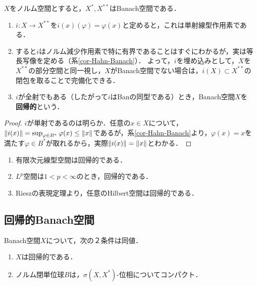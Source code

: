 \documentclass[uplatex,dvipdfmx]{jsreport}
\begin{document}
\begin{definition}
    $X$をノルム空間とすると，$X^*,X^{**}$はBanach空間である．
    \begin{enumerate}
        \item $i:X\to X^{**}$を$i(x)(\varphi)=\varphi(x)$と定めると，これは単射線型作用素である．
        \item すると$i$はノルム減少作用素で特に有界であることはすぐにわかるが，実は等長写像を定める（系\ref{cor-Hahn-Banach}）．
        よって，$i$を埋め込みとして，$X$を$X^{**}$の部分空間と同一視し，$X$がBanach空間でない場合は，$i(X)\subset X^{**}$の閉包を取ることで完備化できる．
        \item $i$が全射でもある（したがって$i$はBanの同型である）とき，Banach空間$X$を\textbf{回帰的}という．
    \end{enumerate}
\end{definition}
\begin{proof}
    $i$が単射であるのは明らか．任意の$x\in X$について，$\|i(x)\|=\sup_{\varphi\in B^*}\varphi(x)\le\|x\|$であるが，系\ref{cor-Hahn-Banach}より，$\varphi(x)=x$を満たす$\varphi\in B^*$が取れるから，実際$\|i(x)\|=\|x\|$とわかる．
\end{proof}
\begin{example}\mbox{}
    \begin{enumerate}
        \item 有限次元線型空間は回帰的である．
        \item $L^p$空間は$1<p<\infty$のとき，回帰的である．
        \item Rieszの表現定理より，任意のHilbert空間は回帰的である．
    \end{enumerate}
\end{example}

\subsection{回帰的Banach空間}

\begin{theorem}\label{thm-characterization-of-reflexive-Banach-spaces}
    Banach空間$X$について，次の２条件は同値．
    \begin{enumerate}
        \item $X$は回帰的である．
        \item ノルム閉単位球$B$は，$\sigma(X,X^*)$-位相についてコンパクト．
    \end{enumerate}
\end{theorem}
\end{document}
